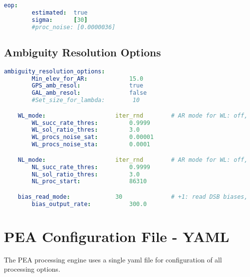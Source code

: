 \begin{lstlisting}[language=yaml,caption=yaml input files configuration example]
	eop:
		estimated:  true
		sigma:      [30]
		#proc_noise: [0.0000036]

\end{lstlisting}


\section{Ambiguity Resolution Options}
%

\begin{lstlisting}[language=yaml,caption=yaml ambiguity configuration example]
	ambiguity_resolution_options:
		Min_elev_for_AR:            15.0
		GPS_amb_resol:              true
		GAL_amb_resol:              false
		#Set_size_for_lambda:        10

	WL_mode:                    iter_rnd        # AR mode for WL: off, round, iter_rnd, bootst, lambda, lambda_alt, lambda_al2, lambda_bie
		WL_succ_rate_thres:         0.9999
		WL_sol_ratio_thres:         3.0
		WL_procs_noise_sat:         0.00001
		WL_procs_noise_sta:         0.0001

	NL_mode:                    iter_rnd        # AR mode for WL: off, round, iter_rnd, bootst, lambda, lambda_alt, lambda_al2, lambda_bie
		NL_succ_rate_thres:         0.9999
		NL_sol_ratio_thres:         3.0
		NL_proc_start:              86310

	bias_read_mode:             30              # +1: read DSB biases, +2: read OSB biases, +4: read code biases, +8: read phase biases, +16: read satellite bias, +32: read station bias,
		bias_output_rate:           300.0
\end{lstlisting}





















\chapter{PEA Configuration File - YAML}
	
The PEA processing engine uses a single yaml file for configuration of all processing options.

